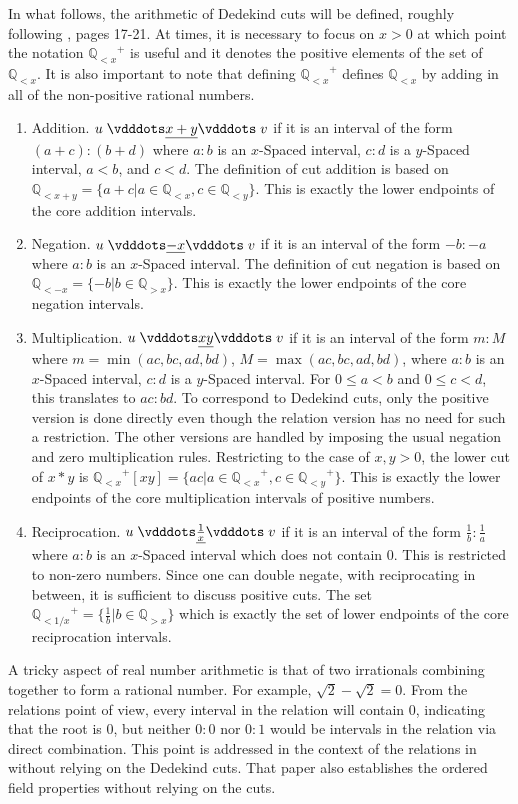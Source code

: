 \documentclass[12pt]{article}
\newcommand{\qcut}[2][x]{\ensuremath{\mathbb{Q}_{#2 #1}}}
\newcommand{\qlt}[1][x]{\qcut[#1]{<}}
\newcommand{\qgt}[1][x]{\qcut[#1]{>}}
\begin{document}
In what follows, the arithmetic of Dedekind cuts will be defined, roughly following \cite{rudin}, pages 17-21.  At times, it is necessary to focus on $x > 0$ at which point the notation $\qlt^+$ is useful and it denotes the positive elements of the set of $\qlt$. It is also important to note that defining $\qlt^+$ defines $\qlt$ by adding in all of the non-positive rational numbers.

\begin{enumerate}
    \item Addition. $u \xrel[x+y] v$ if it is an interval of the form $(a+c):(b+d)$ where $a:b$ is an $x$-Spaced interval, $c:d$ is a $y$-Spaced interval, $a < b$, and $c < d$. The definition of cut addition is based on $\qlt[x+y] = \{a + c | a \in \qlt, c \in \qlt[y]\} $. This is exactly the lower endpoints of the core addition intervals. 
    \item Negation. $u \xrel[-x] v$ if it is an interval of the form $-b:-a$ where $a:b$ is an $x$-Spaced interval. The definition of cut negation is based on $\qlt[-x] = \{-b | b \in \qgt\}$. This is exactly the lower endpoints of the core negation intervals. 
    \item Multiplication. $u \xrel[xy] v$  if it is an interval of the form $m:M$ where $m = \min(ac, bc, ad, bd)$, $M = \max(ac, bc, ad, bd)$, where $a:b$ is an $x$-Spaced interval, $c:d$ is a $y$-Spaced interval. For $0 \leq a < b$ and $0 \leq c < d$, this translates to $ac:bd$. To correspond to Dedekind cuts, only the positive version is done directly even though the relation version has no need for such a restriction. The other versions are handled by imposing the usual negation and zero multiplication rules. Restricting to the case of $x , y > 0$, the lower cut of $x*y$ is $\qlt^+[xy] = \{ac | a \in \qlt^+, c \in \qlt[y]^+ \}$. This is exactly the lower endpoints of the core multiplication intervals of positive numbers. 
    \item Reciprocation. $u \xrel[\frac{1}{x}] v$ if it is an interval of the form $\frac{1}{b}:\frac{1}{a}$ where $a:b$ is an $x$-Spaced interval which does not contain 0. This is restricted to non-zero numbers. Since one can double negate, with reciprocating in between, it is sufficient to discuss positive cuts. The set $\qlt[1/x]^+ = \{\frac{1}{b} | b \in \qgt\}$ which is exactly the set of lower endpoints of the core reciprocation intervals. 
\end{enumerate}

A tricky aspect of real number arithmetic is that of two irrationals combining together to form a rational number. For example, $\sqrt{2} - \sqrt{2} = 0$. From the relations point of view, every interval in the relation will contain $0$, indicating that the root is $0$, but neither $0:0$ nor $0:1$ would be intervals in the relation via direct combination. This point is addressed in the context of the relations in \cite{taylor23main} without relying on the Dedekind cuts. That paper also establishes the ordered field properties without relying on the cuts. 
\end{document}
